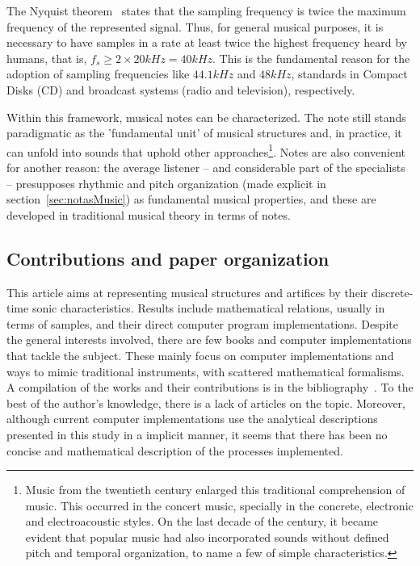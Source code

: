 \documentclass[
 aip,
 jmp,
 amsmath,amssymb,
 reprint,
]{revtex4-1}
\begin{document}
The Nyquist theorem~\cite{} states that the sampling frequency is twice the maximum frequency of the represented signal. Thus, for general musical purposes, it is necessary to have samples in a rate at least twice the highest frequency heard by humans, that is, $f_s \geq 2\times 20kHz = 40kHz$. This is the fundamental reason for the adoption of sampling frequencies like $44.1kHz$ and $48kHz$, standards in Compact Disks (CD) and broadcast systems (radio and television), respectively.

Within this framework, musical notes can be characterized. The note still stands paradigmatic as the 'fundamental unit' of musical structures and, in practice, it can unfold into sounds that uphold other approaches\footnote{Music from the twentieth century enlarged this traditional comprehension of music. This occurred in the concert music, specially in the concrete, electronic and electroacoustic styles. On the last decade of the century, it became evident that popular music had also incorporated sounds without defined pitch and temporal organization, to name a few of simple characteristics.}. 
Notes are also convenient for another reason: the average listener -- and considerable part of the specialists -- presupposes rhythmic and pitch organization (made explicit in section~\ref{sec:notasMusic}) as fundamental musical properties, and these are developed in traditional musical theory in terms of notes.

\subsection{Contributions and paper organization}

This article aims at representing musical structures and artifices by their discrete-time sonic characteristics. Results include mathematical relations, usually in terms of samples, and their direct computer program implementations. Despite the general interests involved, there are few books and computer implementations that tackle the subject. These mainly focus on computer implementations and ways to mimic traditional instruments, with scattered mathematical formalisms. A compilation of the works and their contributions is in the bibliography~\cite{dissertacao}. To the best of the author's knowledge, there is a lack of articles on the topic. Moreover, although current computer implementations use the analytical descriptions presented in this study in a implicit manner, it seems that there has been no concise and mathematical description of the processes implemented. 
\end{document}
